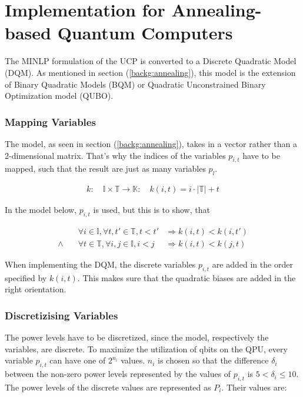 \section{Implementation for Annealing-based Quantum Computers}

The MINLP formulation of the UCP is converted to a Discrete Quadratic Model (DQM).
As mentioned in section (\ref{backg:annealing}), this model is the extension
of Binary Quadratic Models (BQM) or Quadratic Unconstrained Binary Optimization model (QUBO).

\subsubsection{Mapping Variables}

The model, as seen in section (\ref{backg:annealing}), takes in a vector rather than a 2-dimensional matrix.
That's why the indices of the variables $p_{i,t}$ have to be mapped, such that the result are just as many variables $p_{l}$.

\begin{align}
  k:
  \quad
  \mathbb{I} \times \mathbb{T} \to \mathbb{K}:
  \quad
  k(i, t) = i \cdot | \mathbb{T} | + t
\end{align}

In the model below, $p_{i,t}$ is used, but this is to show, that

\begin{subequations}
\begin{align}
  &
  \forall i \in \mathbb{I}, \forall t, t' \in \mathbb{T}, t < t'
  &
  \Rightarrow k(i, t) < k(i, t')
  \\
  \land \quad
  &
  \forall t \in \mathbb{T}, \forall i, j \in \mathbb{I}, i < j
  &
  \Rightarrow k(i, t) < k(j, t)
\end{align}
\end{subequations}

When implementing the DQM, the discrete variables $p_{i, t}$ are added in the order specified by $k(i, t)$.
This makes sure that the quadratic biases are added in the right orientation.

\subsubsection{Discretizising Variables}

The power levels have to be discretized, since the model, respectively the variables, are discrete.
To maximize the utilization of qbits on the QPU, every variable $p_{i, t}$ can have one of $2^{n_i}$ values.
$n_i$ is chosen so that the difference $\delta_i$ between the non-zero power levels represented by the values of $p_{i, t}$
is $5 < \delta_i \leq 10$.
The power levels of the discrete values are represented as $P_i$.
Their values are:

